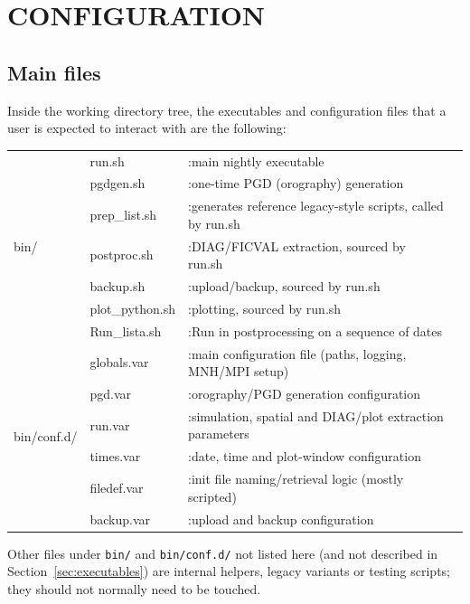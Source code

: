 \section{CONFIGURATION}
\label{sec:config}

\subsection{Main files}
Inside the working directory tree, the executables and configuration files that a user is expected to
interact with are the following:
\begin{table}[H]
\centering
\begin{tabular}{llll}
\hline
\multirow{7}{*}{bin/}\hspace{1.2cm}\ldelim\{{7}{10pt} & run.sh & :main nightly executable\\
 & pgdgen.sh & :one-time PGD (orography) generation\\
 & prep\_list.sh & :generates reference legacy-style scripts, called by run.sh\\
 & postproc.sh & :DIAG/FICVAL extraction, sourced by run.sh\\
 & backup.sh & :upload/backup, sourced by run.sh\\
 & plot\_python.sh & :plotting, sourced by run.sh\\
 & Run\_lista.sh & :Run in postprocessing on a sequence of dates\\
\multirow{6}{*}{bin/conf.d/}\ldelim\{{6}{10pt} & globals.var & :main configuration file (paths, logging, MNH/MPI setup)\\
 & pgd.var & :orography/PGD generation configuration\\
 & run.var & :simulation, spatial and DIAG/plot extraction parameters\\
 & times.var & :date, time and plot-window configuration\\
 & filedef.var & :init file naming/retrieval logic (mostly scripted)\\
 & backup.var & :upload and backup configuration\\
\hline
\end{tabular}
\end{table}
Other files under \texttt{bin/} and \texttt{bin/conf.d/} not listed here (and not described in
Section~\ref{sec:executables}) are internal helpers, legacy variants or testing scripts; they should
not normally need to be touched.

